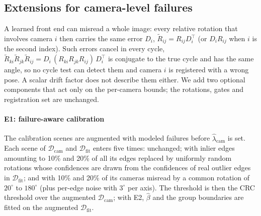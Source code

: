 \subsection{Extensions for camera-level failures}\label{sec:ext}
A learned front end can misread a whole image: every relative rotation that involves camera $i$ then carries the same error $D_i$, $\tilde R_{ij}=R_{ij}D_i^{\top}$ (or $D_iR_{ij}$ when $i$ is the second index). Such errors cancel in every cycle, $\tilde R_{ki}\tilde R_{jk}\tilde R_{ij}=D_i\,(R_{ki}R_{jk}R_{ij})\,D_i^{\top}$ is conjugate to the true cycle and has the same angle, so no cycle test can detect them and camera $i$ is registered with a wrong pose. A scalar drift factor does not describe them either. We add two optional components that act only on the per-camera bounds; the rotations, gates and registration set are unchanged.

\paragraph*{E1: failure-aware calibration} The calibration scenes are augmented with modeled failures before $\hat\lambda_{\mathrm{cam}}$ is set. Each scene of $\mathcal{D}_{\mathrm{cam}}$ and $\mathcal{D}_{\mathrm{fit}}$ enters five times: unchanged; with inlier edges amounting to 10\% and 20\% of all its edges replaced by uniformly random rotations whose confidences are drawn from the confidences of real outlier edges in $\mathcal{D}_{\mathrm{fit}}$; and with 10\% and 20\% of its cameras misread by a common rotation of $20^\circ$ to $180^\circ$ (plus per-edge noise with $3^\circ$ per axis). The threshold is then the CRC threshold over the augmented $\mathcal{D}_{\mathrm{cam}}$; with E2, $\hat\beta$ and the group boundaries are fitted on the augmented $\mathcal{D}_{\mathrm{fit}}$.

